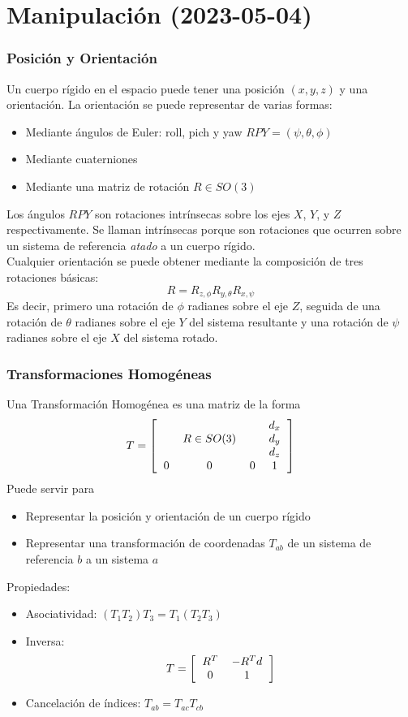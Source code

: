 \section{Manipulación (2023-05-04)}

\begin{frame}\frametitle{Posición y Orientación}
  Un cuerpo rígido en el espacio puede tener una posición $(x,y,z)$ y una orientación. La orientación se puede representar de varias formas:
  \begin{itemize}
  \item Mediante ángulos de Euler: roll, pich y yaw $RPY = (\psi, \theta, \phi)$
  \item Mediante cuaterniones
  \item Mediante una matriz de rotación $R \in SO(3)$
  \end{itemize}
  Los ángulos $RPY$ son rotaciones intrínsecas sobre los ejes $X$, $Y$, y $Z$ respectivamente. Se llaman intrínsecas porque son rotaciones que ocurren sobre un sistema de referencia \textit{atado} a un cuerpo rígido.\\
  Cualquier orientación se puede obtener mediante la composición de tres rotaciones básicas:
  \[R = R_{z,\phi}R_{y,\theta}R_{x,\psi}\]
  Es decir, primero una rotación de $\phi$ radianes sobre el eje $Z$, seguida de una rotación de $\theta$ radianes sobre el eje $Y$ del sistema resultante y una rotación de $\psi$ radianes sobre el eje $X$ del sistema rotado. 
\end{frame}

\begin{frame}\frametitle{Transformaciones Homogéneas}
  Una Transformación Homogénea es una matriz de la forma
  \[T = \left[\begin{tabular}{cccc}
      & & & $d_x$\\
      & $R\in SO(3)$ & & $d_y$\\
      & & & $d_z$\\
      0 & 0& 0 & 1
    \end{tabular}\right]\]
  Puede servir para
  \begin{itemize}
  \item Representar la posición y orientación de un cuerpo rígido
  \item Representar una transformación de coordenadas $T_{ab}$ de un sistema de referencia $b$ a un sistema $a$
  \end{itemize}
  Propiedades:
  \begin{itemize}
  \item Asociatividad: $(T_1 T_2) T_3 = T_1 (T_2 T_3)$
  \item Inversa:
    \[T = \left[\begin{tabular}{cc}
       $R^T$ & $-R^T d$\\
       0 & 1
      \end{tabular}\right]\]
  \item Cancelación de índices: $T_{ab} = T_{ac}T_{cb}$
  \end{itemize}
\end{frame}

